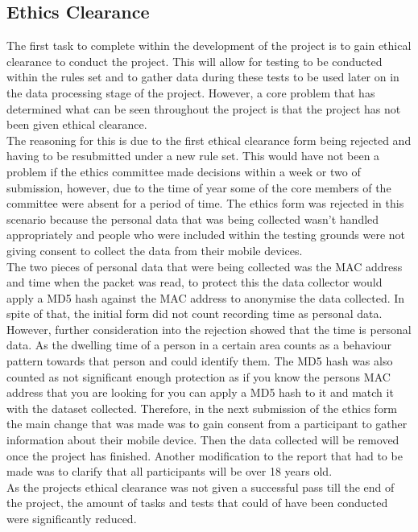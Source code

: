 \documentclass{report}
\begin{document}
\subsection{Ethics Clearance}
The first task to complete within the development of the project is to gain ethical clearance to conduct the project. This will allow for testing to be conducted within the rules set and to gather data during these tests to be used later on in the data processing stage of the project. However, a core problem that has determined what can be seen throughout the project is that the project has not been given ethical clearance. \\ \newline
The reasoning for this is due to the first ethical clearance form being rejected and having to be resubmitted under a new rule set. This would have not been a problem if the ethics committee made decisions within a week or two of submission, however, due to the time of year some of the core members of the committee were absent for a period of time. The ethics form was rejected in this scenario because the personal data that was being collected wasn't handled appropriately and people who were included within the testing grounds were not giving consent to collect the data from their mobile devices. \\ \newline
The two pieces of personal data that were being collected was the MAC address and time when the packet was read, to protect this the data collector would apply a MD5 hash against the MAC address to anonymise the data collected\cite{MD5}. In spite of that, the initial form did not count recording time as personal data. However, further consideration into the rejection showed that the time is personal data. As the dwelling time of a person in a certain area counts as a behaviour pattern towards that person and could identify them. The MD5 hash was also counted as not significant enough protection as if you know the persons MAC address that you are looking for you can apply a MD5 hash to it and match it with the dataset collected. Therefore, in the next submission of the ethics form the main change that was made was to gain consent from a participant to gather information about their mobile device. Then the data collected will be removed once the project has finished. Another modification to the report that had to be made was to clarify that all participants will be over 18 years old.\\ \newline
As the projects ethical clearance was not given a successful pass till the end of the project, the amount of tasks and tests that could of have been conducted were significantly reduced. \\ \newline 
\end{document}
